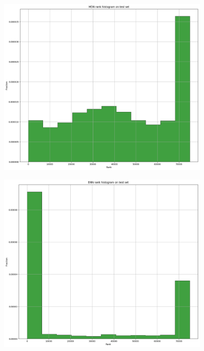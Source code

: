 \documentclass[12pt,a4paper,twoside]{scrartcl}
\numberwithin{equation}{section}
\newcounter{mypagecount}%
\newenvironment{interlude}{%
  \clearpage
  \setcounter{mypagecount}{\value{page}}%
  \thispagestyle{empty}%
  \pagestyle{empty}%
}{%
  \clearpage
  \setcounter{page}{\value{mypagecount}}%
}
\begin{document}
\begin{interlude}
\begin{appendices}
\begin{center}
      \begin{figure}[htpb]
        \centering
        \includegraphics[height=0.6\textwidth, width=0.9\textwidth]{figures/model_plots/mdn-rank-1h}
        \caption[BNN one day rank histogram]{}\label{fig:mdn-rank-1h}
      \end{figure}
    \end{center}
    \begin{center}
      \begin{figure}[htpb]
        \centering
        \includegraphics[height=0.6\textwidth, width=0.9\textwidth]{figures/model_plots/bnn-rank-1h}
        \caption[BNN one day rank histogram]{}\label{fig:bnn-rank-1h}
      \end{figure}
    \end{center}

    \clearpage

  \end{appendices}
  
  
  
  
\end{interlude}
\end{document}
